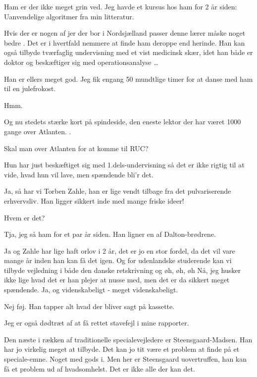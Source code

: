 \documentclass[a4paper,11pt]{article}
\begin{document}
\begin{sketch}
 Ham er der ikke meget grin ved. Jeg havde et kursus hos ham for 2 år siden: Uanvendelige algoritmer fra min litteratur.

 Hvis der er nogen af jer der bor i Nordsjælland passer denne lærer måske noget bedre . Det er i hvertfald nemmere
         at finde ham deroppe end herinde. Han kan også tilbyde tværfaglig undervisning med et vist medicinsk skær, idet
         han både er doktor og beskæftiger sig med operationsanalyse \ldots

 Han er ellers meget god. Jeg fik engang 50 mundtlige timer for at danse med ham til en julefrokost.

  Hmm.

 Og nu stedets stærke kort på spindeside, den eneste lektor der har været 1000 gange over Atlanten. .
         
  Skal man over Atlanten for at komme til RUC?

 Hun har just beskæftiget sig med 1.dels-undervisning så det er ikke rigtig til at vide, hvad hun vil lave, men spændende bli'r det.

 Ja, så har vi Torben Zahle, han er lige vendt tilbage fra det pulvariserende erhvervsliv. Han ligger sikkert inde med mange friske ideer!

 Hvem er det?

 Tja, jeg så ham for et par år siden. Han ligner en af Dalton-brødrene.

 Ja og Zahle har lige haft orlov i 2 år, det er jo en stor fordel, da det vil vare mange år inden han kan få det igen.
         Og for udenlandske studerende kan vi tilbyde vejledning i både den danske retskrivning og øh, øh, øh
          Nå, jeg husker ikke lige hvad det er han plejer at nusse med, men det er
         da sikkert meget spændende. Ja, og videnskabeligt - meget videnskabeligt.

 Nej føj. Han tapper alt hvad der bliver sagt på kassette.

 Jeg er også dødtræt af at få rettet stavefejl i mine rapporter.

 Den næste i rækken af traditionelle specialevejledere er Steensgaard-Madsen. Han har jo virkelig meget at tilbyde.
         Det kan jo tit være et problem at finde på et speciale-emne. Noget med gods i. Men her er Steensgaard uovertruffen,
         han kan få et problem ud af hvadsomhelst. Det er ikke alle der kan det.


\end{sketch}
\end{document}
